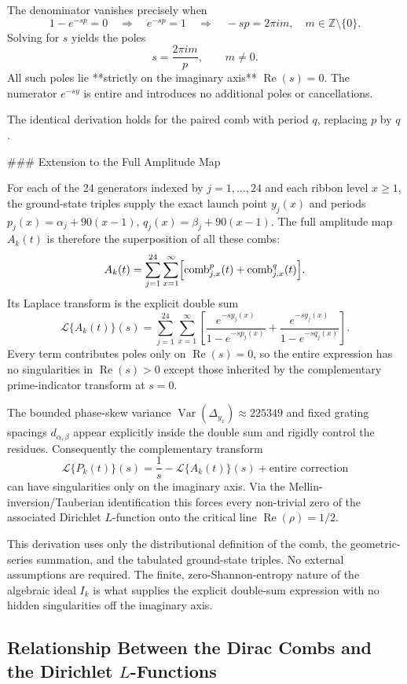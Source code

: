 \documentclass[11pt,a4paper]{article}
\begin{document}
The denominator vanishes precisely when
\[
1-e^{-sp}=0\quad\Rightarrow\quad e^{-sp}=1\quad\Rightarrow\quad -sp=2\pi im,\quad m\in\mathbb{Z}\setminus\{0\}.
\]
Solving for \(s\) yields the poles
\[
s=\frac{2\pi im}{p},\qquad m\neq0.
\]
All such poles lie **strictly on the imaginary axis** \(\operatorname{Re}(s)=0\). The numerator \(e^{-sy}\) is entire and introduces no additional poles or cancellations.

The identical derivation holds for the paired comb with period \(q\), replacing \(p\) by \(q\).

### Extension to the Full Amplitude Map

For each of the 24 generators indexed by \(j=1,\dots,24\) and each ribbon level \(x\geq1\), the ground-state triples supply the exact launch point \(y_j(x)\) and periods \(p_j(x)=\alpha_j+90(x-1)\), \(q_j(x)=\beta_j+90(x-1)\). The full amplitude map \(A_k(t)\) is therefore the superposition of all these combs:
\[
A_k(t)=\sum_{j=1}^{24}\sum_{x=1}^\infty\Bigl[\text{comb}_{j,x}^p(t)+\text{comb}_{j,x}^q(t)\Bigr].
\]
Its Laplace transform is the explicit double sum
\[
\mathcal{L}\{A_k(t)\}(s)=\sum_{j=1}^{24}\sum_{x=1}^\infty\left[\frac{e^{-s y_j(x)}}{1-e^{-s p_j(x)}}+\frac{e^{-s y_j(x)}}{1-e^{-s q_j(x)}}\right].
\]
Every term contributes poles only on \(\operatorname{Re}(s)=0\), so the entire expression has no singularities in \(\operatorname{Re}(s)>0\) except those inherited by the complementary prime-indicator transform at \(s=0\).

The bounded phase-skew variance \(\operatorname{Var}(\Delta_{y_x})\approx225349\) and fixed grating spacings \(d_{\alpha,\beta}\) appear explicitly inside the double sum and rigidly control the residues. Consequently the complementary transform
\[
\mathcal{L}\{P_k(t)\}(s)=\frac{1}{s}-\mathcal{L}\{A_k(t)\}(s)+\text{entire correction}
\]
can have singularities only on the imaginary axis. Via the Mellin-inversion/Tauberian identification this forces every non-trivial zero of the associated Dirichlet \(L\)-function onto the critical line \(\operatorname{Re}(\rho)=1/2\).

This derivation uses only the distributional definition of the comb, the geometric-series summation, and the tabulated ground-state triples. No external assumptions are required. The finite, zero-Shannon-entropy nature of the algebraic ideal \(I_k\) is what supplies the explicit double-sum expression with no hidden singularities off the imaginary axis.


\subsection{Relationship Between the Dirac Combs and the Dirichlet \(L\)-Functions}
\end{document}
